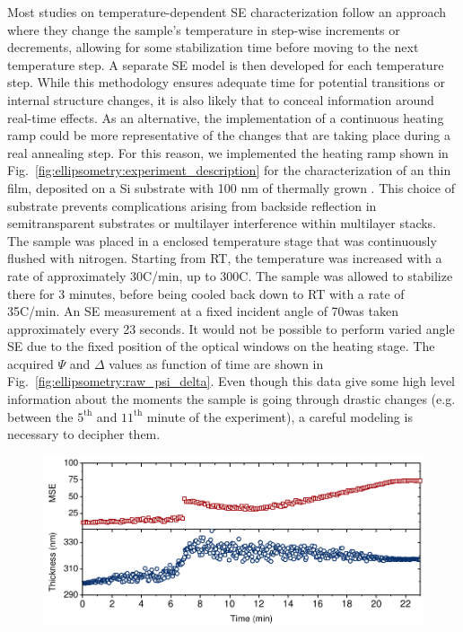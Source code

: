 Most studies on temperature-dependent SE characterization follow an approach where they change the sample's temperature in step-wise increments or decrements, allowing for some stabilization time before moving to the next temperature step. A separate SE model is then developed for each temperature step. While this methodology ensures adequate time for potential transitions or internal structure changes, it is also likely that to conceal information around real-time effects. As an alternative, the implementation of a continuous heating ramp could be more representative of the changes that are taking place during a real annealing step. For this reason, we implemented the heating ramp shown in Fig.~\ref{fig:ellipsometry:experiment_description} for the characterization of an   thin film, deposited on a Si substrate with 100 nm of thermally grown . This choice of substrate prevents complications arising from backside reflection in semitransparent substrates or multilayer interference within multilayer stacks. The sample was placed in a enclosed temperature stage that was continuously flushed with nitrogen. Starting from RT, the temperature was increased with a rate of approximately 30\degree C/min, up to 300\degree C. The sample was allowed to stabilize there for 3 minutes, before being cooled back down to RT with a rate of 35\degree C/min. An SE measurement at a fixed incident angle of 70\degree was taken approximately every 23 seconds. It would not be possible to perform varied angle SE due to the fixed position of the optical windows on the heating stage. The acquired $\Psi$ and $\Delta$ values
as function of time are shown in Fig.~\ref{fig:ellipsometry:raw_psi_delta}. Even though this data give some high level information about the moments the sample is going through drastic changes (e.g. between the $5^{\text{th}}$ and $11^{\text{th}}$ minute of the experiment), a careful modeling is necessary to decipher them. 

\begin{figure}
  \centering
  \medskip
  \includegraphics[width=.99\textwidth]{chapters/ellipsometry/image/wrong_model.pdf}
  \caption{}
  \label{fig:ellipsometry:wrong_model}
\end{figure}

